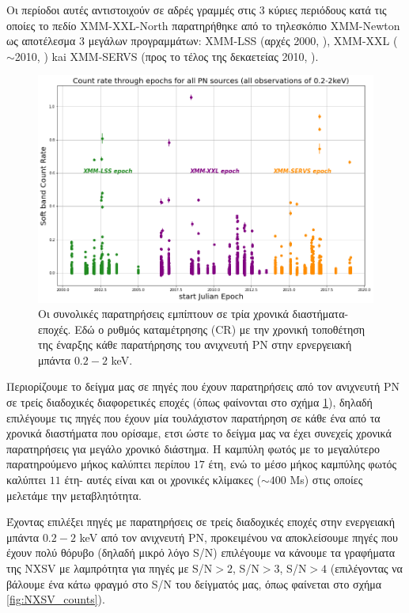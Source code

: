 Οι περίοδοι αυτές αντιστοιχούν σε αδρές γραμμές στις 3 κύριες περιόδους κατά τις οποίες το πεδίο \textlatin{XMM-XXL-North} παρατηρήθηκε από το τηλεσκόπιο \textlatin{XMM-Newton} ως αποτέλεσμα 3 μεγάλων προγραμμάτων: \textlatin{XMM-LSS} (αρχές 2000, \cite{2006MNRAS.372..591P}), \textlatin{XMM-XXL} ($\sim$2010, \cite{2016A&A...592A...1P}) kai \textlatin{XMM-SERVS} (προς το τέλος της δεκαετείας 2010, \cite{2018MNRAS.478.2132C}).

\begin{figure} 
 \includegraphics[width=0.9\linewidth]{Figures/Epochs.png}
 \caption{Οι συνολικές παρατηρήσεις εμπίπτουν σε τρία χρονικά διαστήματα- εποχές. Εδώ ο ρυθμός καταμέτρησης (\textlatin{CR}) με την χρονική τοποθέτηση της έναρξης κάθε παρατήρησης του ανιχνευτή \textlatin{PN} στην ερνεργειακή μπάντα $0.2-2$ \textlatin{keV}. }
 \label{fig:Epochs}
 \end{figure}
 
Περιορίζουμε το δείγμα μας σε πηγές που έχουν παρατηρήσεις από τον ανιχνευτή \textlatin{PN} σε τρείς διαδοχικές διαφορετικές εποχές (όπως φαίνονται στο σχήμα \ref{fig:Epochs}), δηλαδή επιλέγουμε τις πηγές που έχουν μία τουλάχιστον παρατήρηση σε κάθε ένα από τα χρονικά διαστήματα που ορίσαμε, ετσι ώστε το δείγμα μας να έχει συνεχείς χρονικά παρατηρήσεις για μεγάλο χρονικό διάστημα. Η καμπύλη φωτός με το μεγαλύτερο παρατηρούμενο μήκος καλύπτει περίπου $17$ έτη, ενώ το μέσο μήκος καμπύλης φωτός καλύπτει $11$ έτη- αυτές είναι και οι χρονικές κλίμακες ($\sim 400$ \textlatin{Ms}) στις οποίες μελετάμε την μεταβλητότητα. 

Έχοντας επιλέξει πηγές με παρατηρήσεις σε τρείς διαδοχικές εποχές στην ενεργειακή μπάντα $0.2-2$ \textlatin{keV} από τον ανιχνευτή \textlatin{PN}, προκειμένου να αποκλείσουμε πηγές που έχουν πολύ θόρυβο (δηλαδή μικρό λόγο \textlatin{S/N}) επιλέγουμε να κάνουμε τα γραφήματα της  \textlatin{NXSV} με λαμπρότητα για πηγές με \textlatin{S/N}$>2$, \textlatin{S/N}$>3$, \textlatin{S/N}$>4$ (επιλέγοντας να βάλουμε ένα κάτω φραγμό στο \textlatin{S/N} του δείγματός μας, όπως φαίνεται στο σχήμα \ref{fig:NXSV_counts}).

